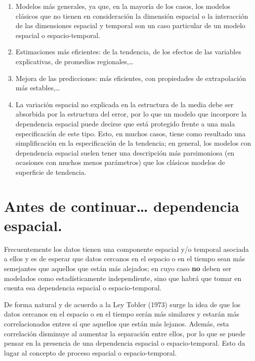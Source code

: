 \documentclass[
]{book}
\begin{document}
\begin{enumerate}
\def\labelenumi{\arabic{enumi}.}
\item
  Modelos más generales, ya que, en la mayoría de los casos, los modelos
  clásicos que no tienen en consideración la dimensión espacial o la
  interacción de las dimensiones espacial y temporal son un caso particular de
  un modelo espacial o espacio-temporal.
\item
  Estimaciones más eficientes: de la tendencia, de los efectos de las
  variables explicativas, de promedios regionales,\ldots{}
\item
  Mejora de las predicciones: más eficientes, con propiedades de extrapolación
  más estables,\ldots{}
\item
  La variación espacial no explicada en la estructura de la media debe ser
  absorbida por la estructura del error, por lo que un modelo que incorpore la
  dependencia espacial puede decirse que está protegido frente a una mala
  especificación de este tipo. Esto, en muchos casos, tiene como resultado una
  simplificación en la especificación de la tendencia; en general, los modelos
  con dependencia espacial suelen tener una descripción más parsimoniosa (en
  ocasiones con muchos menos parámetros) que los clásicos modelos de
  superficie de tendencia.
\end{enumerate}

\hypertarget{antes-de-continuar-dependencia-espacial.}{%
\section{Antes de continuar\ldots{} dependencia espacial.}\label{antes-de-continuar-dependencia-espacial.}}

Frecuentemente los datos tienen una componente espacial y/o temporal asociada a
ellos y es de esperar que datos cercanos en el espacio o en el tiempo sean más
semejantes que aquellos que están más alejados; en cuyo caso \textbf{no} deben ser
modelados como estadísticamente independiente, sino que habrá que tomar en
cuenta esa dependencia espacial o espacio-temporal.

De forma natural y de acuerdo a la Ley Tobler (1973) surge la idea de que los
datos cercanos en el espacio o en el tiempo serán más similares y estarán más
correlacionados entres sí que aquellos que están más lejanos. Además, esta
correlación disminuye al aumentar la separación entre ellos, por lo que se puede
pensar en la presencia de una dependencia espacial o espacio-temporal. Esto da
lugar al concepto de proceso espacial o espacio-temporal.
\end{document}
